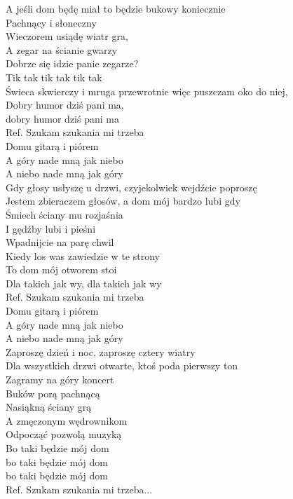 
\begin{flushleft}
A jeśli dom będę miał to będzie bukowy koniecznie  \\
Pachnący i słoneczny  \\
Wieczorem usiądę wiatr gra,  \\
A zegar na ścianie gwarzy \\
Dobrze się idzie panie zegarze?  \\
Tik tak tik tak tik tak \\
Świeca skwierczy i mruga przewrotnie więc puszczam oko do niej,  \\
Dobry humor dziś pani ma, \\
dobry humor dziś pani ma \\
\vskip 3mm
Ref. Szukam szukania mi trzeba\\
\hspace{0.9cm}Domu gitarą i piórem \\
\hspace{0.9cm}A góry nade mną jak niebo \\
\hspace{0.9cm}A niebo nade mną jak góry \\
\vskip 3mm
Gdy głosy usłyszę u drzwi, czyjekolwiek wejdźcie poproszę \\
Jestem zbieraczem głosów, a dom mój bardzo lubi gdy \\
Śmiech ściany mu rozjaśnia \\
I gędźby lubi i pieśni \\
Wpadnijcie na parę chwil \\
Kiedy los was zawiedzie w te strony \\
To dom mój otworem stoi \\
Dla takich jak wy, dla takich jak wy \\
\vskip 3mm
Ref. Szukam szukania mi trzeba\\
\hspace{0.9cm}Domu gitarą i piórem \\
\hspace{0.9cm}A góry nade mną jak niebo \\
\hspace{0.9cm}A niebo nade mną jak góry \\
\vskip 3mm
Zaproszę dzień i noc, zaproszę cztery wiatry \\
Dla wszystkich drzwi otwarte, ktoś poda pierwszy ton \\
Zagramy na góry koncert \\
Buków porą pachnącą \\
Nasiąkną ściany grą \\
A zmęczonym wędrownikom \\
Odpocząć pozwolą muzyką \\
Bo taki będzie mój dom \\
bo taki będzie mój dom \\
bo taki będzie mój dom \\
\vskip 3mm
Ref. Szukam szukania mi trzeba...
\end{flushleft}
\clearpage

